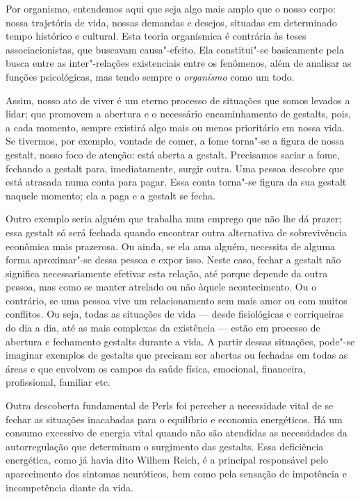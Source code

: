 Por organismo, entendemos aqui que seja algo mais amplo que o nosso
corpo: nossa trajetória de vida, nossas demandas e desejos,
situadas em determinado tempo histórico e cultural. Esta teoria
organísmica é contrária às teses associacionistas, que buscavam
causa"-efeito. Ela constitui"-se basicamente pela busca entre as
inter"-relações existenciais entre os fenômenos, além de analisar as
funções psicológicas, mas tendo sempre o \emph{organismo} como um todo.

Assim, nosso ato de viver é um eterno processo de situações que somos
levados a lidar; que promovem a abertura e o necessário encaminhamento
de gestalts, pois, a cada momento, sempre existirá algo mais ou menos
prioritário em nossa vida. Se tivermos, por exemplo, vontade de comer, a
fome torna"-se a figura de nossa gestalt, nosso foco de atenção: está
aberta a gestalt. Precisamos saciar a fome, fechando a gestalt para,
imediatamente, surgir outra. Uma pessoa descobre que está atrasada numa
conta para pagar. Essa conta torna"-se figura da sua gestalt naquele
momento; ela a paga e a gestalt se fecha.

Outro exemplo seria alguém que trabalha num emprego que não lhe dá
prazer; essa gestalt só será fechada quando encontrar outra alternativa
de sobrevivência econômica mais prazerosa. Ou ainda, se ela ama alguém,
necessita de alguma forma aproximar"-se dessa pessoa e expor isso. Neste
caso, fechar a gestalt não significa necessariamente efetivar esta
relação, até porque depende da outra pessoa, mas como se manter atrelado
ou não àquele acontecimento. Ou o contrário, se uma pessoa vive um
relacionamento sem mais amor ou com muitos conflitos. Ou seja, todas as
situações de vida --- desde fisiológicas e corriqueiras do dia a dia, até
as mais complexas da existência --- estão em processo de abertura e
fechamento gestalts durante a vida. A partir dessas situações, pode"-se
imaginar exemplos de gestalts que precisam ser abertas ou fechadas em
todas as áreas e que envolvem os campos da saúde física, emocional,
financeira, profissional, familiar etc.

Outra descoberta fundamental de Perls foi perceber a necessidade vital
de se fechar as situações inacabadas para o equilíbrio e economia
energéticos. Há um consumo excessivo de energia vital quando não são
atendidas as necessidades da autorregulação que determinam o surgimento
das gestalts. Essa deficiência energética, como já havia dito Wilhem
Reich, é a principal responsável pelo aparecimento dos sintomas
neuróticos, bem como pela sensação de impotência e incompetência diante
da vida.

